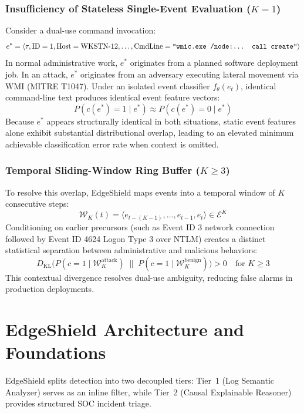 \documentclass[10pt,journal,compsoc]{IEEEtran}
\begin{document}
\subsubsection{Insufficiency of Stateless Single-Event Evaluation ($K=1$)}
Consider a dual-use command invocation:
\begin{equation}
e^* = \langle \tau, \text{ID}=1, \text{Host}=\text{WKSTN-12}, \dots, \text{CmdLine}=\text{\texttt{"wmic.exe /node:... call create"}} \rangle
\end{equation}
In normal administrative work, $e^*$ originates from a planned software deployment job. In an attack, $e^*$ originates from an adversary executing lateral movement via WMI (MITRE T1047). Under an isolated event classifier $f_{\theta}(e_t)$, identical command-line text produces identical event feature vectors:
\begin{equation}
P(c(e^*) = 1 \mid e^*) \approx P(c(e^*) = 0 \mid e^*)
\end{equation}
Because $e^*$ appears structurally identical in both situations, static event features alone exhibit substantial distributional overlap, leading to an elevated minimum achievable classification error rate when context is omitted.

\subsubsection{Temporal Sliding-Window Ring Buffer ($K \ge 3$)}
To resolve this overlap, EdgeShield maps events into a temporal window of $K$ consecutive steps:
\begin{equation}
\mathcal{W}_K(t) = \langle e_{t-(K-1)}, \dots, e_{t-1}, e_t \rangle \in \mathcal{E}^K
\end{equation}
Conditioning on earlier precursors (such as Event ID 3 network connection followed by Event ID 4624 Logon Type 3 over NTLM) creates a distinct statistical separation between administrative and malicious behaviors:
\begin{equation}
D_{\text{KL}}\Big( P(c=1 \mid \mathcal{W}_K^{\text{attack}}) \;\Big\|\; P(c=1 \mid \mathcal{W}_K^{\text{benign}}) \Big) > 0 \quad \text{for } K \ge 3
\end{equation}
This contextual divergence resolves dual-use ambiguity, reducing false alarms in production deployments.

\section{EdgeShield Architecture and Foundations}
EdgeShield splits detection into two decoupled tiers: Tier~1 (Log Semantic Analyzer) serves as an inline filter, while Tier~2 (Causal Explainable Reasoner) provides structured SOC incident triage.
\end{document}
